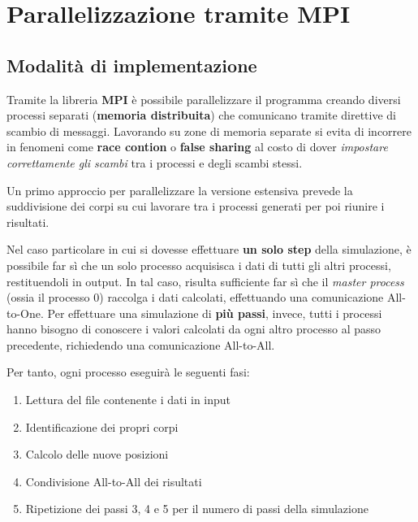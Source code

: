 \documentclass[12pt]{report}
\begin{document}
    \newpage

    \newpage

    \section{Parallelizzazione tramite MPI}

    \subsection{Modalità di implementazione}

    Tramite la libreria \textbf{MPI} è possibile parallelizzare il programma creando diversi processi separati (\textbf{memoria distribuita}) che comunicano tramite direttive di scambio di messaggi. Lavorando su zone di memoria separate si evita di incorrere in fenomeni come \textbf{race contion} o \textbf{false sharing} al costo di dover \textit{impostare correttamente gli scambi} tra i processi e degli scambi stessi.

    Un primo approccio per parallelizzare la versione estensiva prevede la suddivisione dei corpi su cui lavorare tra i processi generati per poi riunire i risultati.
    
    Nel caso particolare in cui si dovesse effettuare \textbf{un solo step} della simulazione, è possibile far sì che un solo processo acquisisca i dati di tutti gli altri processi, restituendoli in output. In tal caso, risulta sufficiente far sì che il \textit{master process} (ossia il processo 0) raccolga i dati calcolati, effettuando una comunicazione All-to-One. Per effettuare una simulazione di \textbf{più passi}, invece, tutti i processi hanno bisogno di conoscere i valori calcolati da ogni altro processo al passo precedente, richiedendo una comunicazione All-to-All.

    Per tanto, ogni processo eseguirà le seguenti fasi:
    \begin{enumerate}
        \item Lettura del file contenente i dati in input
        \item Identificazione dei propri corpi
        \item Calcolo delle nuove posizioni 
        \item Condivisione All-to-All dei risultati
        \item Ripetizione dei passi 3, 4 e 5 per il numero di passi della simulazione 
    \end{enumerate}
\end{document}
